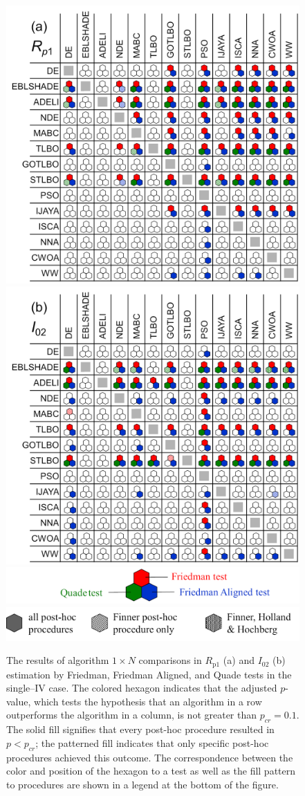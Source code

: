 \documentclass[a4paper,fleqn]{cas-dc}
\begin{document}
\begin{figure}[]
	\centering
		\includegraphics[width=.49\textwidth]{Rp1shotN1}
        \includegraphics[width=.49\textwidth]{I02shotN1}
        \includegraphics[width=.48\textwidth]{Titleshot11N}
		\includegraphics[width=.48\textwidth]{Titleshot21N}
	  \caption{The results of algorithm $1\times N$ comparisons in $R_\mathrm{p1}$ (a) and $I_{02}$ (b) estimation
               by Friedman, Friedman Aligned, and Quade tests in the single--IV case.
               The colored hexagon indicates that the adjusted $p$-value,
               which tests the hypothesis that an algorithm in a row outperforms the algorithm in a column,
               is not greater than $p_{cr}=0.1$.
               The solid fill signifies that every post-hoc procedure resulted in $p<p_{cr}$;
               the patterned fill indicates that only specific post-hoc procedures achieved this outcome.
               The correspondence between the color and position of the hexagon to a test
               as well as the fill pattern to procedures are shown in a legend at the bottom of the figure.
               }\label{figN1RezSingleIV}
\end{figure}
\end{document}
